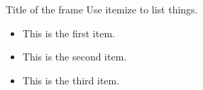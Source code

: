 \begin{frame}{Title of the frame}
  Use itemize to list things.
  
  \begin{itemize}
  \item This is the first item. 
  \item This is the second item.
  \item This is the third item.
  \end{itemize}
\end{frame}

